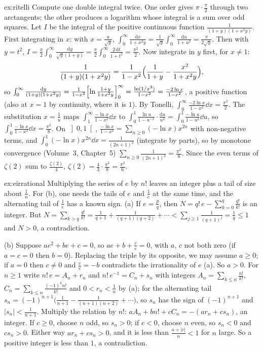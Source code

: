 \begin{solution}{ex:ritelli}
\idea Compute one double integral twice. One order gives $\pi\cdot\frac\pi2$ through two arctangents; the other produces a
logarithm whose integral is a sum over odd squares.
\writeup Let $I$ be the integral of the positive continuous function $\frac1{(1+y)(1+x^2y)}$. First integrating in $x$: with
$x=\frac u{\sqrt y}$, $\int_0^\infty\frac{\mathrm dx}{1+x^2y}=\frac1{\sqrt y}\int_0^\infty\frac{\mathrm du}{1+u^2}=\frac\pi{2\sqrt y}$. Then with $y=t^2$,
$I=\frac\pi2\int_0^\infty\frac{\mathrm dy}{\sqrt y(1+y)}=\frac\pi2\int_0^\infty\frac{2\,\mathrm dt}{1+t^2}=\frac{\pi^2}2$. Now integrate in $y$ first, for $x\ne1$:
\[
\frac1{(1+y)(1+x^2y)}=\frac1{1-x^2}\Bigl(\frac1{1+y}-\frac{x^2}{1+x^2y}\Bigr),
\]
so $\int_0^\infty\frac{\mathrm dy}{(1+y)(1+x^2y)}=\frac1{1-x^2}\Bigl[\ln\frac{1+y}{1+x^2y}\Bigr]_0^\infty=\frac{\ln(1/x^2)}{1-x^2}=\frac{-2\ln x}{1-x^2}$, a
positive function (also at $x=1$ by continuity, where it is $1$). By Tonelli, $\int_0^\infty\frac{-2\ln x}{1-x^2}\dd x=\frac{\pi^2}2$. The
substitution $x=\frac1u$ maps $\int_1^\infty\frac{-\ln x}{1-x^2}\dd x$ to $\int_0^1\frac{\ln u}{1-u^{-2}}\cdot\frac{\mathrm du}{u^2}=\int_0^1\frac{-\ln u}{1-u^2}\dd u$, so
$\int_0^1\frac{-\ln x}{1-x^2}\dd x=\frac{\pi^2}8$. On $\left]0,1\right[$, $\frac{-\ln x}{1-x^2}=\sum_{n\ge0}(-\ln x)x^{2n}$ with non-negative terms, and
$\int_0^1(-\ln x)x^{2n}\dd x=\frac1{(2n+1)^2}$ (integrate by parts), so by monotone convergence (Volume~3, Chapter~5)
$\sum_{n\ge0}\frac1{(2n+1)^2}=\frac{\pi^2}8$. Since the even terms of $\zeta(2)$ sum to $\frac{\zeta(2)}4$, $\zeta(2)=\frac43\cdot\frac{\pi^2}8=\frac{\pi^2}6$.
\end{solution}

\begin{solution}{ex:eirrational}
\idea Multiplying the series of $e$ by $n!$ leaves an integer plus a tail of size about $\frac1n$. For (b), one needs the tails
of $e$ and $\frac1e$ at the same time, and the alternating tail of $\frac1e$ has a known sign.
\writeup (a) If $e=\frac pq$, then $N=q!\,e-\sum_{k=0}^q\frac{q!}{k!}$ is an integer. But
$N=\sum_{k>q}\frac{q!}{k!}=\frac1{q+1}+\frac1{(q+1)(q+2)}+\cdots<\sum_{j\ge1}\frac1{(q+1)^j}=\frac1q\le1$ and $N>0$, a contradiction.

(b) Suppose $ae^2+be+c=0$, so $ae+b+\frac ce=0$, with $a$, $c$ not both zero (if $a=c=0$ then $b=0$). Replacing the triple by its
opposite, we may assume $a\ge0$; if $a=0$ then $c\ne0$ and $\frac ce=-b$ contradicts the irrationality of $e$ (a). So $a>0$. For
$n\ge1$ write $n!\,e=A_n+r_n$ and $n!\,e^{-1}=C_n+s_n$ with integers $A_n=\sum_{k\le n}\frac{n!}{k!}$,
$C_n=\sum_{k\le n}\frac{(-1)^kn!}{k!}$ and $0<r_n<\frac1n$ by (a); for the alternating tail
$s_n=(-1)^{n+1}\bigl(\frac1{n+1}-\frac1{(n+1)(n+2)}+\cdots\bigr)$, so $s_n$ has the sign of $(-1)^{n+1}$ and $|s_n|<\frac1{n+1}$. Multiply the
relation by $n!$: $aA_n+bn!+cC_n=-(ar_n+cs_n)$, an integer. If $c\ge0$, choose $n$ odd, so $s_n>0$; if $c<0$, choose $n$ even, so
$s_n<0$ and $cs_n>0$. Either way $ar_n+cs_n>0$, and it is less than $\frac{a+|c|}n<1$ for $n$ large. So a positive integer is less
than $1$, a contradiction.
\end{solution}

